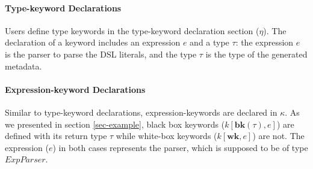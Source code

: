 \documentclass{sig-alternate}
\makeatletter
\newcommand\BeraMonottfamily{%
  \def\fvm@Scale{0.85}%
  \fontfamily{fvm}\selectfont%
}
\newcommand{\textcd}[1]{\textbf{\scriptsize\BeraMonottfamily{#1}}}
\newcommand{\mycaption}[1]{\vspace{-4px}\caption{#1}\vspace{-2px}}
\newcommand{\tabularspace}{~~~~~~~~}
\makeatother
\begin{document}
\begin{comment}
$\omega$~::=~$\emptyset$                      \\
\tabularspace$l[\mathbf{val},\tau];\omega$                 & \textcd{val} $l$ : $\tau$\\
\tabularspace$l[\mathbf{def},\tau];\omega$                 & \textcd{def} $l$ : $\tau$\\
\multicolumn{3}{l}{Casetype Cases}\\
$\chi$~::=~$\emptyset$                      \\                 
\tabularspace$C[\tau];\chi$                   & $C$~\textcd{of}~$\tau$\\
\multicolumn{3}{l}{External Term}\\
 $e$~::=~...                              & \\
\tabularspace$\mathbf{lit}[body]$             & $delims$\\
\tabularspace$\mathbf{ekey}[k,body](e)$       & $e.k$ $delims$\\
\multicolumn{3}{l}{Translational Terms}\\
$\hat{e}$~::=~...                              & \\
\tabularspace$\mathbf{spliced}[e]$            & \\
\multicolumn{3}{l}{Internal Terms}\\
$i$~::=~...                                                     
\end{tabular}
\mycaption{Abstract and Concrete Forms}
\label{formal-syntax}
\end{figure}
\end{comment}


\paragraph{Type-keyword Declarations}
Users define type keywords in the type-keyword declaration section ($\eta$). The declaration of a keyword includes an expression $e$ and a type $\tau$: the expression $e$ is the parser to parse the DSL literals, and the type $\tau$ is the type of the generated metadata.

\paragraph{Expression-keyword Declarations}
Similar to type-keyword declarations, expression-keywords are declared in $\kappa$. As we presented in section \ref{sec-example}, black box keywords ($k[\mathbf{bk}(\tau),e]$) are defined with its return type $\tau$ while white-box keywords ($k[\mathbf{wk}, e]$) are not. The expression ($e$) in both cases represents the parser, which is supposed to be of type $ExpParser$.
\end{document}
